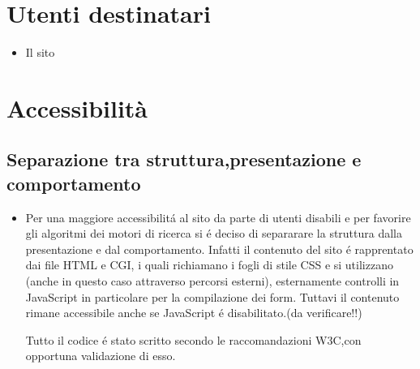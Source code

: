 \documentclass[12pt]{article}
\begin{document}
		\section{Utenti destinatari}
		\begin{itemize}
			\item Il sito 
		\end{itemize}
		\section{Accessibilit\`a}
		\subsection{Separazione tra struttura,presentazione e comportamento}
		\begin{itemize}
			\item Per una maggiore accessibilit\'a al sito da parte di utenti disabili e per favorire gli algoritmi dei motori di ricerca si \'e deciso di separarare la struttura dalla presentazione e dal comportamento.
			Infatti il contenuto del sito \'e rapprentato dai file HTML e CGI, i quali richiamano i fogli di stile CSS e si utilizzano (anche in questo caso attraverso percorsi esterni), esternamente controlli in JavaScript in particolare per la compilazione dei form. Tuttavi il contenuto rimane accessibile anche se JavaScript \'e disabilitato.(da verificare!!)
			
			Tutto il codice \'e stato scritto secondo le raccomandazioni W3C,con opportuna validazione di esso.
		\end{itemize}
\end{document}
